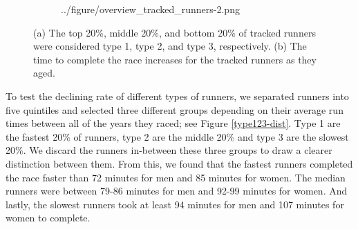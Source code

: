 \documentclass[12pt]{article}
\begin{document}
\begin{figure}
\begin{subfigure}[]{0.49\textwidth}
		{../figure/overview_tracked_runners-2.png}
		\caption{}
		\label{top-10-tracked}
	\end{subfigure}
	\caption{
		(a) The top 20\%, middle 20\%, and bottom 20\% of
			tracked runners were considered type 1, type 2, and
			type 3, respectively.
		(b) The time to complete the race increases for the
			tracked runners as they aged.
	}
	\label{type123}
\end{figure}



To test the declining rate of different types of runners,
we separated runners into five quintiles and selected three different
groups depending on their average run times between all of the years they
raced; see Figure \ref{type123-dist}.
Type 1 are the fastest 20\% of runners, type 2 are the middle 20\% and
type 3 are the slowest 20\%.
We discard the runners in-between these three groups to draw a clearer
distinction between them.
From this, we found that the fastest runners completed the race faster
than 72 minutes for men and 85 minutes for women.
The median runners were between 79-86 minutes for men and 92-99 minutes
for women.
And lastly, the slowest runners took at least 94 minutes for men and
107 minutes for women to complete.
\end{document}

